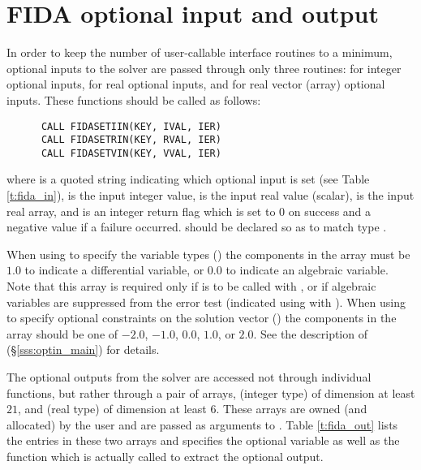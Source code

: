 \section{FIDA optional input and output}\label{fida_opt_inout}

In order to keep the number of user-callable {\fida} interface routines to
a minimum, optional inputs to the {\ida} solver are passed through only
three routines:  for integer optional inputs, 
for real optional inputs, and  for real vector (array) optional
inputs.  These functions should be called as follows:
\begin{verbatim}
      CALL FIDASETIIN(KEY, IVAL, IER)
      CALL FIDASETRIN(KEY, RVAL, IER)
      CALL FIDASETVIN(KEY, VVAL, IER)
\end{verbatim}
where  is a quoted string indicating which optional input is set
(see Table \ref{t:fida_in}),  is the input integer value,
 is the input real value (scalar),
 is the input real array, and
 is an integer return flag which is set to $0$ on success and
a negative value if a failure occurred.
 should be declared so as to match {\CC} type .

When using  to specify the variable types ()
the components in the array  must be $1.0$ to indicate a differential 
variable, or $0.0$ to indicate an algebraic variable.
Note that this array is required only if  is to be called
with , or if algebraic variables are suppressed from the error
test (indicated using  with ).
%
When using  to specify optional constraints on the
solution vector () the components in the
array  should be one of $-2.0$, $-1.0$, $0.0$, $1.0$, or $2.0$.
See the description of  (\S\ref{sss:optin_main})
for details.

The optional outputs from the {\ida} solver are accessed not through
individual functions, but rather through a pair of arrays, 
(integer type) of dimension at least $21$, and  (real type) of
dimension at least $6$.  These arrays are owned (and allocated) by
the user and are passed as arguments to .  Table
\ref{t:fida_out} lists the entries in these two arrays and specifies
the optional variable as well as the {\ida} function which is actually
called to extract the optional output.

